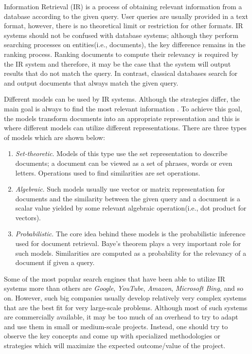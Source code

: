 \label{chap:literature}
Information Retrieval (IR) is a process of obtaining relevant information from a database according to 
the given query. User queries are usually provided in a text format, however, there is no theoretical 
limit or restriction for other formats. IR systems should not be confused with database systems; 
although they perform searching processes on entities(i.e., documents), the key difference remains in 
the ranking process. Ranking documents to compute their relevancy is required by the IR system and 
therefore, it may be the case that the system will output results that do not match the query. In 
contrast, classical databases search for and output documents that always match the given query.

Different models can be used by IR systems. Although the strategies differ, the main goal 
is always to find the most relevant information \cite{baeza1999modern,brin1998anatomy}. 
To achieve this goal, the models transform documents 
into an appropriate representation and this is where different models can utilize different 
representations. There are three types of models which are shown below:

\begin{enumerate}
	\item \textit{Set-theoretic}. 
		Models of this type use the set representation to describe documents; a document can be viewed 
		as a set of phrases, words or even letters. Operations used to find similarities are set 
		operations.
	\item \textit{Algebraic}.
		Such models usually use vector or matrix representation for documents and the similarity 
		between the given query and a document is a scalar value yielded by some relevant algebraic 
		operation(i.e., dot product for vectors).
	\item \textit{Probabilistic}.
		The core idea behind these models is the probabilistic inference used for document retrieval. 
		Baye's theorem \cite{enwiki:1094315386} plays a very important role for such models. Similarities 
		are computed as a probability for the relevancy of a document if given a query.
\end{enumerate}

Some of the most popular search engines that have been able to utilize IR systems more than others are 
\textit{Google}, \textit{YouTube}, \textit{Amazon}, \textit{Microsoft Bing}, and so on. However, such 
big companies usually develop relatively very complex systems that are the best fit for very large-scale  
problems. Although most of such systems are commercially available, it may be too much of an overhead 
to try to adapt and use them in small or medium-scale projects. Instead, one should try to observe 
the key concepts and come up with specialized methodologies or strategies which will maximize 
the expected outcome/value of the project.

